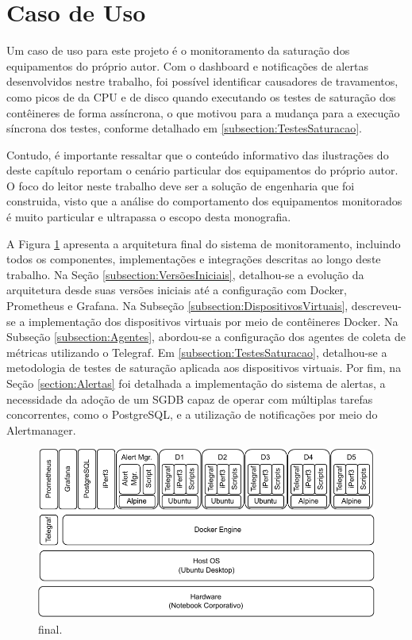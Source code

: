 \section{Caso de Uso}
\label{section:CasosDeUso}

Um caso de uso para este projeto é o monitoramento da saturação dos equipamentos do próprio autor. Com o dashboard e notificações de alertas desenvolvidos nestre trabalho, foi possível identificar causadores de travamentos, como picos de  da CPU e  de disco quando executando os testes de saturação dos contêineres de forma assíncrona, o que motivou para a mudança para a execução síncrona dos testes, conforme detalhado em \ref{subsection:TestesSaturacao}.

Contudo, é importante ressaltar que o conteúdo informativo das ilustrações do deste capítulo reportam o cenário particular dos equipamentos do próprio autor. O foco do leitor neste trabalho deve ser a solução de engenharia que foi construida, visto que a análise do comportamento dos equipamentos monitorados é muito particular e ultrapassa o escopo desta monografia.

A Figura \ref{fig:StackFinal} apresenta a arquitetura final do sistema de monitoramento, incluindo todos os componentes, implementações e integrações descritas ao longo deste trabalho. Na Seção \ref{subsection:VersõesIniciais}, detalhou-se a evolução da arquitetura desde suas versões iniciais até a configuração com Docker, Prometheus e Grafana. Na Subseção \ref{subsection:DispositivosVirtuais}, descreveu-se a implementação dos dispositivos virtuais por meio de contêineres Docker. Na Subseção \ref{subsection:Agentes}, abordou-se a configuração dos agentes de coleta de métricas utilizando o Telegraf. Em \ref{subsection:TestesSaturacao}, detalhou-se a metodologia de testes de saturação aplicada aos dispositivos virtuais. Por fim, na Seção \ref{section:Alertas} foi detalhada a implementação do sistema de alertas, a necessidade da adoção de um SGDB capaz de operar com múltiplas tarefas concorrentes, como o PostgreSQL, e a utilização de notificações por meio do Alertmanager.

\begin{figure}[H]
\centering
\setlength{\abovecaptionskip}{-20pt}
\includegraphics[width=\textwidth]{Imagens/chap04/final_stack.pdf}
\caption{ final.}
\label{fig:StackFinal}
\end{figure}


